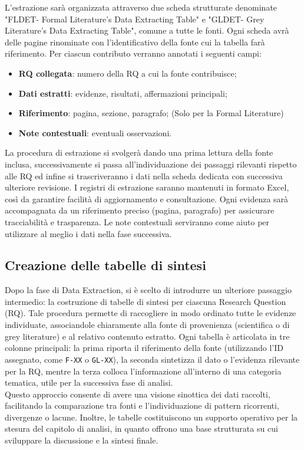 \documentclass[a4paper,9pt]{article}
\begin{document}
	L’estrazione sarà organizzata attraverso due scheda strutturate denominate "FLDET- Formal Literature's Data Extracting Table" e "GLDET- Grey Literature's Data Extracting Table", comune a tutte le fonti. Ogni scheda avrà delle pagine rinominate con l'identificativo della fonte cui la tabella farà riferimento.  
	Per ciascun contributo verranno annotati i seguenti campi:
	\begin{itemize}
		\item \textbf{RQ collegata}: numero della RQ a cui la fonte contribuisce;
		\item \textbf{Dati estratti}: evidenze, risultati, affermazioni principali;
		\item \textbf{Riferimento}: pagina, sezione, paragrafo; (Solo per la Formal Literature)
		\item \textbf{Note contestuali}: eventuali osservazioni.
	\end{itemize}
	La procedura di estrazione si svolgerà dando una prima lettura della fonte inclusa, successivamente si passa all'individuazione dei passaggi rilevanti rispetto alle RQ ed infine si trascriveranno i dati nella scheda dedicata con successiva ulteriore revisione.\newline
	I registri di estrazione saranno mantenuti in formato Excel, così da garantire facilità di aggiornamento e consultazione.
	Ogni evidenza sarà accompagnata da un riferimento preciso (pagina, paragrafo) per assicurare tracciabilità e trasparenza. Le note contestuali serviranno come aiuto per utilizzare al meglio i dati nella fase successiva.
	
	\subsection{Creazione delle tabelle di sintesi}
	
	Dopo la fase di Data Extraction, si è scelto di introdurre un ulteriore passaggio intermedio: 
	la costruzione di tabelle di sintesi per ciascuna Research Question (RQ). 
	Tale procedura permette di raccogliere in modo ordinato tutte le evidenze individuate, 
	associandole chiaramente alla fonte di provenienza (scientifica o di grey literature) 
	e al relativo contenuto estratto.
	Ogni tabella è articolata in tre colonne principali: la prima riporta il riferimento 
	della fonte (utilizzando l’ID assegnato, come \texttt{F-XX} o \texttt{GL-XX}), 
	la seconda sintetizza il dato o l’evidenza rilevante per la RQ, mentre la terza 
	colloca l’informazione all’interno di una categoria tematica, utile per la successiva fase di analisi.\\
	Questo approccio consente di avere una visione sinottica dei dati raccolti, 
	facilitando la comparazione tra fonti e l’individuazione di pattern ricorrenti, 
	divergenze o lacune. Inoltre, le tabelle costituiscono un supporto operativo 
	per la stesura del capitolo di analisi, in quanto offrono una base strutturata 
	su cui sviluppare la discussione e la sintesi finale.
	
\end{document}
